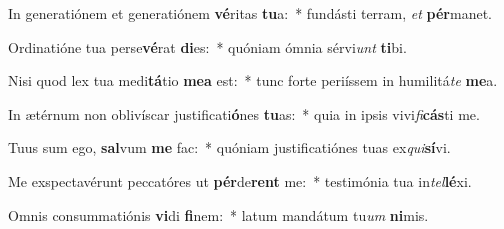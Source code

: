 \item In generatiónem et generatiónem \textbf{vé}ritas \textbf{tu}a:~* fundásti terram, \textit{et} \textbf{pér}manet.
\item Ordinatióne tua perse\textbf{vé}rat \textbf{di}es:~* quóniam ómnia sérvi\textit{unt} \textbf{ti}bi.
\item Nisi quod lex tua medi\textbf{tá}tio \textbf{me}\textbf{a} est:~* tunc forte periíssem in humilitá\textit{te} \textbf{me}a.
\item In ætérnum non oblivíscar justificati\textbf{ó}nes \textbf{tu}as:~* quia in ipsis vivi\textit{fi}\textbf{cás}ti me.
\item Tuus sum ego, \textbf{sal}vum \textbf{me} fac:~* quóniam justificatiónes tuas ex\textit{qui}\textbf{sí}vi.
\item Me exspectavérunt peccatóres ut \textbf{pér}de\textbf{rent} me:~* testimónia tua in\textit{tel}\textbf{lé}xi.
\item Omnis consummatiónis \textbf{vi}di \textbf{fi}nem:~* latum mandátum tu\textit{um} \textbf{ni}mis.
